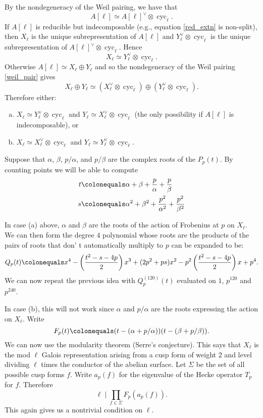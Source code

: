 \documentclass[11pt]{amsart}
\newcommand{\cyc}{\operatorname{cyc}}
\theoremstyle{definition}
\theoremstyle{remark}
\begin{document}
By the nondegeneracy of the Weil pairing, we have that
\begin{equation}\label{weil_pair}A[\ell] \simeq A[\ell]^\vee \otimes \cyc_\ell.\end{equation}
If $A[\ell]$ is reducible but indecomposable (e.g., equation \eqref{red_extn} is non-split), then $X_{\ell}$ is the unique subrepresentation of $A[\ell]$ and $Y_\ell^\vee \otimes \cyc_{\ell}$ is the unique subrepresentation of $A[\ell]^\vee \otimes \cyc_\ell$.  Hence
\[ X_\ell \simeq Y_\ell^\vee \otimes \cyc_\ell.\]
Otherwise $A[\ell] \simeq X_\ell \oplus Y_\ell$ and so the nondegeneracy of the Weil pairing \eqref{weil_pair} gives
\[X_\ell \oplus Y_\ell \simeq \left(X_\ell^\vee \otimes \cyc_\ell\right) \oplus \left(Y_\ell^\vee \otimes \cyc_\ell\right).\]
Therefore either:
\begin{enumerate}[(a)]
\item $X_\ell \simeq Y_\ell^\vee \otimes \cyc_\ell$ and $Y_\ell\simeq X_\ell^\vee \otimes \cyc_\ell$ (the only possibility if $A[\ell]$ is indecomposable), or 
\item $X_\ell \simeq X_\ell^\vee \otimes \cyc_\ell$ and $Y_\ell \simeq Y_\ell^\vee \otimes \cyc_\ell$.
\end{enumerate}

Suppose that $\alpha$, $\beta$, $p/\alpha$, and $p/\beta$ are the complex roots of the $P_p(t)$.  By counting points we will be able to compute
\begin{align*}
t &\colonequals \alpha + \beta + \frac{p}{\alpha} + \frac{p}{\beta} \\
s &\colonequals \alpha^2 + \beta^2 + \frac{p^2}{\alpha^2} + \frac{p^2}{\beta^2} 
\end{align*}

In case (a) above, $\alpha$ and $\beta$ are the roots of the action of Frobenius at $p$ on $X_\ell$.  We can then form the degree $4$ polynomial whose roots are the products of the pairs of roots that don'
t automatically multiply to $p$ can be expanded to be:
\[Q_p(t) \colonequals x^4 - \left( \frac{t^2 - s - 4p}{2} \right) x^3 + (2p^2 + ps)x^2 - p^2\left( \frac{t^2 - s - 4p}{2} \right)x + p^4.\]
We can now repeat the previous idea with $Q_p^{(120)}(t)$ evaluated on $1$, $p^{120}$ and $p^{240}$.

In case (b), this will not work since $\alpha$ and $p/\alpha$ are the roots expressing the action on $X_\ell$.  Write 
\[F_p(t) \colonequals (t - (\alpha + p/\alpha))(t - (\beta + p/\beta)).\]
We can now use the modularity theorem (Serre's conjecture).  This says that $X_\ell$ is the mod $\ell$ Galois representation arising from a cusp form of weight $2$ and level dividing $\ell$ times the conductor of the abelian surface.  Let $\Sigma$ be the set of all possible cusp forms $f$.  Write $a_p(f)$ for the eigenvalue of the Hecke operator $T_p$ for $f$.  Therefore
\[\ell \mid \prod_{f \in \Sigma} F_p(a_p(f)).\]
This again gives us a nontrivial condition on $\ell$.
\end{document}
